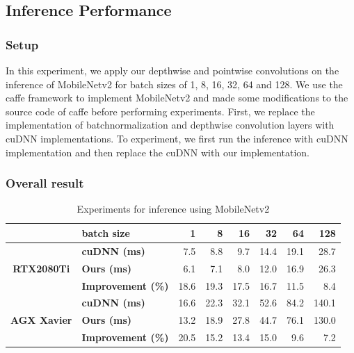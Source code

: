 \subsection{Inference Performance}
\label{sec:inferexp}
\subsubsection{Setup} In this experiment, we apply our depthwise and pointwise convolutions on the inference of MobileNetv2 for batch sizes of 1, 8, 16, 32, 64 and 128.
We use the caffe framework to implement MobileNetv2 and made some modifications to the source code of caffe before performing experiments. 
First, we replace the implementation of batchnormalization and depthwise convolution layers with cuDNN implementations. 
To experiment, we first run the inference with cuDNN implementation and then replace the cuDNN with our implementation.

\subsubsection{Overall result}
\begin{table}[]
\setlength{\tabcolsep}{3.4pt}
    \caption{Experiments for inference using MobileNetv2}
    \label{tab:infertime}
    \centering
    \begin{threeparttable}
    \begin{tabular}{c|l|rrrrrr}
    \toprule
    &\textbf{batch size} & 1 & 8 & 16& 32 &64 & 128\\
    \midrule
    \multirow{3}{*}{\textbf{RTX2080Ti}}&\textbf{cuDNN (ms)} & 7.5  & 8.8 & 9.7 & 14.4 & 19.1 &28.7 \\
    &\textbf{Ours (ms)} &6.1   &7.1    & 8.0  &12.0 &16.9 &26.3\\
    &\textbf{Improvement (\%)} &18.6   &19.3    &17.5  & 16.7 &11.5 &8.4 \\
    \hline
    \multirow{3}{*}{\textbf{AGX Xavier}}&\textbf{cuDNN (ms)} & 16.6&22.3&32.1&52.6&84.2&140.1  \\
    &\textbf{Ours (ms)} &13.2&18.9&27.8&44.7&76.1&130.0 \\
    &\textbf{Improvement (\%)} & 20.5&15.2&13.4&15.0&9.6&7.2 \\
    \bottomrule
    \end{tabular}
    \footnotesize
    \end{threeparttable}
    \vspace{-5mm}
\end{table}

